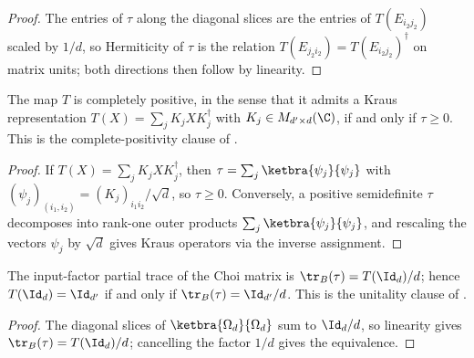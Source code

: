 \begin{proof}
    \leanok
    The entries of $\tau$ along the diagonal slices are the entries of
    $T(E_{i_2 j_2})$ scaled by $1/d$, so Hermiticity of $\tau$ is the
    relation $T(E_{j_2 i_2})=T(E_{i_2 j_2})^\dagger$ on matrix units; both
    directions then follow by linearity.
\end{proof}

\begin{theorem}
    \label{thm:choi_rect_cp}
    \leanok
    The map $T$ is completely positive, in the sense that it admits a Kraus
    representation $T(X)=\sum_{j}K_jXK_j^\dagger$ with
    $K_j\in M_{d'\times d}(\C)$, if and only if $\tau\geq0$. This is the
    complete-positivity clause of \cite[Proposition~2.1]{Wolf2012Quantum}.
\end{theorem}

\begin{proof}
    \leanok
    If $T(X)=\sum_j K_jXK_j^\dagger$, then
    $\tau=\sum_j\ketbra{\psi_j}{\psi_j}$ with
    $(\psi_j)_{(i_1,i_2)}=(K_j)_{i_1 i_2}/\sqrt{d}$, so $\tau\geq0$.
    Conversely, a positive semidefinite $\tau$ decomposes into rank-one
    outer products $\sum_j\ketbra{\psi_j}{\psi_j}$, and rescaling the
    vectors $\psi_j$ by $\sqrt{d}$ gives Kraus operators via the inverse
    assignment.
\end{proof}

\begin{theorem}[Unitality]
    \label{thm:choi_rect_unital}
    \leanok
    The input-factor partial trace of the Choi matrix is
    $\tr_B(\tau)=T(\Id_d)/d$; hence $T(\Id_d)=\Id_{d'}$ if and only if
    $\tr_B(\tau)=\Id_{d'}/d$. This is the unitality clause of
    \cite[Proposition~2.1]{Wolf2012Quantum}.
\end{theorem}

\begin{proof}
    \leanok
    The diagonal slices of $\ketbra{\Omega_d}{\Omega_d}$ sum to $\Id_d/d$,
    so linearity gives $\tr_B(\tau)=T(\Id_d)/d$; cancelling the factor
    $1/d$ gives the equivalence.
\end{proof}

